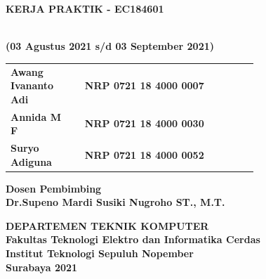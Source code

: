 \begin{flushleft}

  \sffamily

  \noindent\textbf{KERJA PRAKTIK - EC184601}
  \vspace{4ex}

   \\
  \textbf{(03 Agustus 2021 s/d 03 September 2021)}
  \vspace{6ex}

  \vspace{6ex}

  \begin{adjustwidth}{-2mm}{}
    \begin{tabular}{lcp{0.7\linewidth}}
      \textbf{Awang Ivananto Adi} & & \textbf{NRP 0721 18 4000 0007} \\
      \textbf{Annida M F} & & \textbf{NRP 0721 18 4000 0030} \\
      \textbf{Suryo Adiguna} & & \textbf{NRP 0721 18 4000 0052} \\
    \end{tabular}
  \end{adjustwidth}
  \vspace{4ex}

  \noindent
  \textbf{Dosen Pembimbing} \\
  \textbf{Dr.Supeno Mardi Susiki Nugroho ST., M.T.}
  \vspace{10ex}

  \noindent\textbf{DEPARTEMEN TEKNIK KOMPUTER} \\
  \textbf{Fakultas Teknologi Elektro dan Informatika Cerdas} \\
  \textbf{Institut Teknologi Sepuluh Nopember} \\
  \textbf{Surabaya 2021}

\end{flushleft}

\restoregeometry
